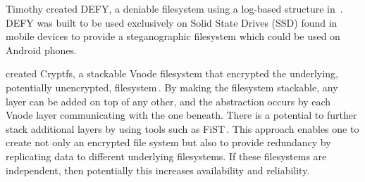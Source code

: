 Timothy \citeauthor{petersDEFYDeniableFile2014} created DEFY, a deniable filesystem using a log-based structure in \citeyear{petersDEFYDeniableFile2014}\,\cite{petersDEFYDeniableFile2014}. DEFY was built to be used exclusively on Solid State Drives (SSD) found in mobile devices to provide a steganographic filesystem which could be used on Android phones.

\citeauthor{badulescuCryptfsStackableVnode1998} created Cryptfs, a stackable Vnode filesystem that encrypted the underlying, potentially unencrypted, filesystem\,\cite{badulescuCryptfsStackableVnode1998}. By making the filesystem stackable, any layer can be added on top of any other, and the abstraction occurs by each Vnode layer communicating with the one beneath. There is a potential to further stack additional layers by using tools such as FiST\,\cite{FiSTStackableFile}. This approach enables one to create not only an encrypted file system but also to provide redundancy by replicating data to different
underlying filesystems. If these filesystems are independent, then potentially this increases availability and reliability.


